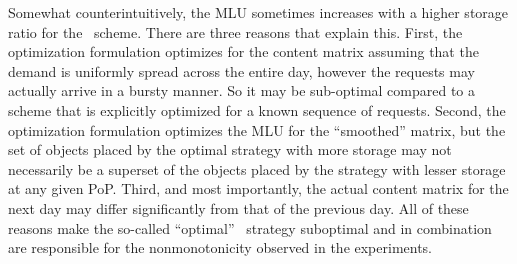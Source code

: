 










 
Somewhat counterintuitively, the MLU sometimes increases with a higher storage ratio for the \optrp\ scheme. There are three reasons that explain this. First, the optimization formulation optimizes for the content matrix assuming that the demand is uniformly spread across the entire day, however the requests may actually arrive in a bursty manner. So it may be sub-optimal compared to a scheme that is explicitly optimized for a known sequence of requests. Second,  the optimization formulation optimizes the MLU for the ``smoothed'' matrix, but the set of objects placed by the optimal strategy with more storage may not necessarily be a superset of the objects placed by the strategy with lesser storage at any given PoP. Third, and most importantly, the actual content matrix for the next day may differ significantly from that of the previous day. All of these reasons make the so-called ``optimal'' \optrp\ strategy suboptimal and in combination are responsible for the nonmonotonicity observed in the experiments.





